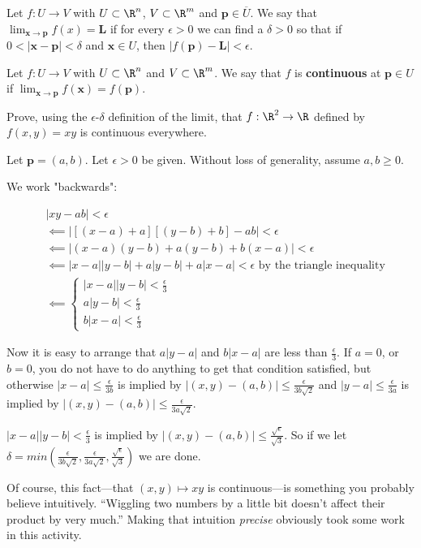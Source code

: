 \documentclass{ximera}
\begin{document}
\begin{definition}
	Let $f:U \to  V$  with $U \subset \R^n$, $V \subset \R^m$ and $\mathbf{p} \in \overline{U}$.  We say that $\lim_{\mathbf{x} \to \mathbf{p}}f(x) = \mathbf{L}$ if for every $\epsilon >0$ we can find a 
	$\delta>0$ so that if $0<|\mathbf{x}-\mathbf{p}|<\delta$ and $\mathbf{x} \in U$, then $|f(\mathbf{p})-\mathbf{L}|<\epsilon$.
\end{definition}

\begin{definition}
	 Let $f:U \to  V$  with $U \subset \R^n$ and $V \subset \R^m$.  We say that $f$ is \textbf{continuous} at $\mathbf{p} \in U$ if $\lim_{\mathbf{x} \to \mathbf{p}} f(\mathbf{x}) = f(\mathbf{p})$. 
\end{definition}

Prove, using the $\epsilon$-$\delta$ definition of the limit, that $f:\R^2 \to \R$ defined by $f(x,y) = xy$ is continuous everywhere.

\begin{free-response}
	Let $\mathbf{p} = (a,b)$.   Let $\epsilon>0$ be given.  Without loss of generality, assume $a,b \geq 0$.
	
	We work "backwards":
	
	\begin{align*}
		&|xy-ab|<\epsilon\\
		&\impliedby |[(x-a)+a][(y-b)+b]-ab| <\epsilon \\
		&\impliedby |(x-a)(y-b)+a(y-b) +b(x-a)| <\epsilon \\
		&\impliedby |x-a||y-b|+a|y-b|+a|x-a|< \epsilon \text{ by the triangle inequality}\\
		&\impliedby \begin{cases}
			|x-a||y-b| < \frac{\epsilon}{3}\\
			a|y-b| < \frac{\epsilon}{3}\\
			b|x-a| < \frac{\epsilon}{3}
			\end{cases}
	\end{align*}
	
	Now it is easy to arrange that $a|y-a|$  and $b|x-a|$ are less than $\frac{\epsilon}{3}$.  If $a=0$, or $b=0$, 
	you do not have to do anything to get that condition satisfied, but otherwise $|x-a| \leq \frac{\epsilon}{3b}$ is implied by $|(x,y) - (a,b)| \leq \frac{\epsilon}{3b\sqrt{2}}$
	and  $|y-a| \leq \frac{\epsilon}{3a}$ is implied by $|(x,y) - (a,b)| \leq \frac{\epsilon}{3a\sqrt{2}}$.
	
	$|x-a||y-b| < \frac{\epsilon}{3}$ is implied by $|(x,y)-(a,b)| \leq \frac{\sqrt{\epsilon}}{\sqrt{3}}$.  
	So if we let $\delta = min(\frac{\epsilon}{3b\sqrt{2}}, \frac{\epsilon}{3a\sqrt{2}}, \frac{\sqrt{\epsilon}}{\sqrt{3}})$ 
	we are done.
\end{free-response}

Of course, this fact---that $(x,y) \mapsto xy$ is continuous---is something you probably believe intuitively.  ``Wiggling two numbers by a little bit doesn't affect their product by very much.''  Making that intuition \textit{precise} obviously took some work in this activity.
\end{document}
